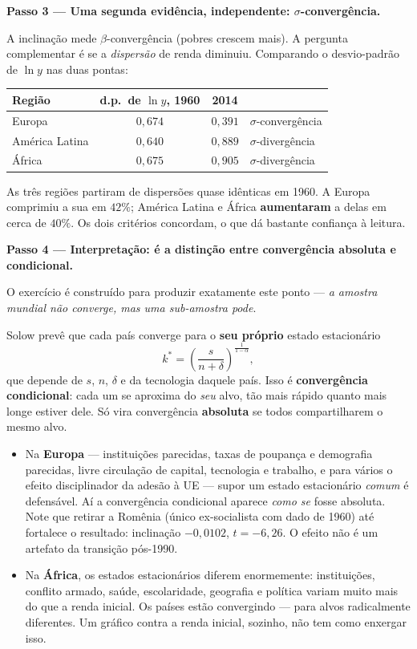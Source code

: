\documentclass[11pt, a4paper]{article}
\newcommand{\passo}[1]{\medskip\noindent\textbf{#1}\par\nobreak}
\newcommand{\stst}{^{\ast}}
\begin{document}
\passo{Passo 3 --- Uma segunda evidência, independente: $\sigma$-convergência.} A
inclinação mede $\beta$-convergência (pobres crescem mais). A pergunta complementar é se a
\emph{dispersão} de renda diminuiu. Comparando o desvio-padrão de $\ln y$ nas duas pontas:

\begin{center}
\small
\begin{tabular}{lccl}
\toprule
\textbf{Região} & \textbf{d.p.\ de $\ln y$, 1960} & \textbf{2014} & \\
\midrule
Europa         & $0{,}674$ & $0{,}391$ & $\sigma$-convergência \\
América Latina & $0{,}640$ & $0{,}889$ & $\sigma$-divergência \\
África         & $0{,}675$ & $0{,}905$ & $\sigma$-divergência \\
\bottomrule
\end{tabular}
\end{center}

As três regiões partiram de dispersões quase idênticas em 1960. A Europa comprimiu a sua
em $42\%$; América Latina e África \textbf{aumentaram} a delas em cerca de $40\%$. Os dois
critérios concordam, o que dá bastante confiança à leitura. \checkmark

\passo{Passo 4 --- Interpretação: é a distinção entre convergência absoluta e
condicional.} O exercício é construído para produzir exatamente este ponto --- \emph{a
amostra mundial não converge, mas uma sub-amostra pode}.

Solow prevê que cada país converge para o \textbf{seu próprio} estado estacionário
$$k\stst = \left(\frac{s}{n+\delta}\right)^{\frac{1}{1-\alpha}},$$
que depende de $s$, $n$, $\delta$ e da tecnologia daquele país. Isso é
\textbf{convergência condicional}: cada um se aproxima do \emph{seu} alvo, tão mais rápido
quanto mais longe estiver dele. Só vira convergência \textbf{absoluta} se todos
compartilharem o mesmo alvo.

\begin{itemize}
\item Na \textbf{Europa} --- instituições parecidas, taxas de poupança e demografia
      parecidas, livre circulação de capital, tecnologia e trabalho, e para vários o efeito
      disciplinador da adesão à UE --- supor um estado estacionário \emph{comum} é
      defensável. Aí a convergência condicional aparece \emph{como se} fosse absoluta. Note
      que retirar a Romênia (único ex-socialista com dado de 1960) até fortalece o
      resultado: inclinação $-0{,}0102$, $t = -6{,}26$. O efeito não é um artefato da
      transição pós-1990.
\item Na \textbf{África}, os estados estacionários diferem enormemente: instituições,
      conflito armado, saúde, escolaridade, geografia e política variam muito mais do que a
      renda inicial. Os países estão convergindo --- para alvos radicalmente diferentes. Um
      gráfico contra a renda inicial, sozinho, não tem como enxergar isso.
\end{itemize}
\end{document}

